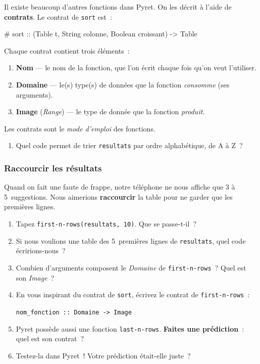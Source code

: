 \documentclass[12pt,a4paper]{article}
\newcommand{\contrat}[1]{%
  \begin{contractbox}
    \ttfamily #1
  \end{contractbox}
}
\begin{document}
Il existe beaucoup d'autres fonctions dans Pyret. On les décrit à l'aide de \textbf{contrats}. Le contrat de \texttt{sort} est~:

\contrat{\# sort :: (Table t, String colonne, Boolean croissant) -> Table}

Chaque contrat contient trois éléments~:
\begin{enumerate}[leftmargin=*]
  \item \textbf{Nom} — le nom de la fonction, que l'on écrit chaque fois qu'on veut l'utiliser.
  \item \textbf{Domaine} — le(s) type(s) de données que la fonction \emph{consomme} (ses arguments).
  \item \textbf{Image} (\emph{Range}) — le type de donnée que la fonction \emph{produit}.
\end{enumerate}

Les contrats sont le \emph{mode d'emploi} des fonctions.

\begin{activitybox}
  \begin{enumerate}[leftmargin=*, resume]
    \item Quel code permet de trier \texttt{resultats} par ordre alphabétique, de A à Z~?
  \end{enumerate}
\end{activitybox}

\subsubsection{Raccourcir les résultats}

Quand on fait une faute de frappe, notre téléphone ne nous affiche que 3 à 5~suggestions. Nous aimerions \textbf{raccourcir} la table pour ne garder que les premières lignes.

\begin{activitybox}
  \begin{enumerate}[leftmargin=*, resume]
    \item Tapez \texttt{first\allowbreak-n\allowbreak-rows(resultats, 10)}. Que se passe-t-il~?
    \item Si nous voulions une table des 5~premières lignes de \texttt{resultats}, quel code écririons-nous~?
    \item Combien d'arguments composent le \emph{Domaine} de \texttt{first-n-rows}~? Quel est son \emph{Image}~?
    \item En vous inspirant du contrat de \texttt{sort}, écrivez le contrat de \texttt{first-n-rows}~:

    \begin{center}
      \texttt{nom\_fonction :: Domaine -> Image}
    \end{center}
    \item Pyret possède aussi une fonction \texttt{last-n-rows}. \textbf{Faites une prédiction}~: quel est son contrat~?
    \item Testez-la dans Pyret~! Votre prédiction était-elle juste~?
  \end{enumerate}
\end{activitybox}
\end{document}
